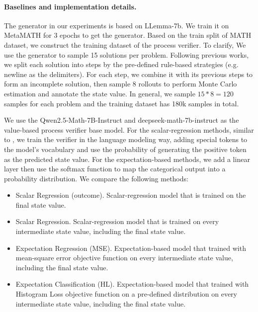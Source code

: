 \paragraph{Baselines and implementation details.}
The generator in our experiments is based on LLemma-7b. We train it on MetaMATH for 3 epochs to get the generator. Based on the train split of MATH dataset, we construct the training dataset of the process verifier. To clarify, We use the generator to sample 15 solutions per problem. Following previous works\citep{DBLP:conf/iclr/LightmanKBEBLLS24, DBLP:conf/acl/WangLSXDLCWS24}, we split each solution into steps by the pre-defined rule-based strategies (e.g. newline as the delimiters). For each step, we combine it with its previous steps to form an incomplete solution, then sample 8 rollouts to perform Monte Carlo estimation and annotate the state value. In general, we sample $15*8=120$ samples for each problem and the training dataset has 180k samples in total.

We use the Qwen2.5-Math-7B-Instruct\citep{yang2024qwen2} and deepseek-math-7b-instruct\citep{DBLP:journals/corr/abs-2402-03300} as the value-based process verifier base model. For the scalar-regression methods, similar to \citet{DBLP:conf/acl/WangLSXDLCWS24}, we train the verifier in the language modeling way, adding special tokens to the model's vocabulary and use the probability of generating the positive token as the predicted state value. For the expectation-based methods, we add a linear layer then use the softmax function to map the categorical output into a probability distribution. We compare the following methods:
\begin{itemize}
    \item Scalar Regression (outcome). Scalar-regression model that is trained on the final state value.
    \item Scalar Regression. Scalar-regression model that is trained on every intermediate state value, including the final state value.
    \item Expectation Regression (MSE). Expectation-based model that trained with mean-square error objective function on every intermediate state value, including the final state value.
    \item Expectation Classification (HL). Expectation-based model that trained with Histogram Loss objective function on a pre-defined distribution on every intermediate state value, including the final state value.
\end{itemize}

